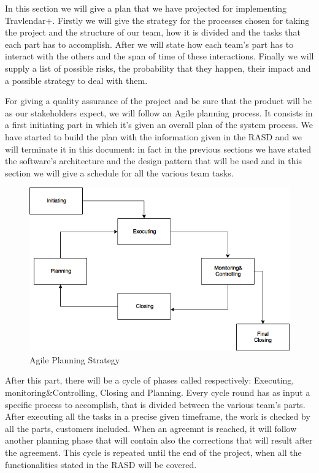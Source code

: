 In this section we will give a plan that we have projected for implementing Travlendar+. 
Firstly we will give the strategy for the processes chosen for taking the project and the structure of our team, how it is divided and the tasks that each part has to accomplish.
After we will state how each team’s part has to interact with the others and the span of time of these interactions. 
Finally we will supply a list of possible risks, the probability that they happen, their impact and a possible strategy to deal with them.

For giving a quality assurance of the project and be sure that the product will be as our stakeholders expect, we will follow an Agile planning process. It consists in a first initiating part in which it’s given an overall plan of the system process. We have started to build the plan with the information given in the RASD and we will terminate it in this document: in fact in the previous sections we have stated the software’s architecture and the design pattern that will be used and in this section we will give a schedule for all the various team tasks.
\begin{figure}[H]
	\centering
	\includegraphics[scale=0.35]{Images/Implementation/Agile_Planning}
	\caption{Agile Planning Strategy}
\end{figure}
After this part, there will be a cycle of phases called respectively: Executing, monitoring\&Controlling, Closing and Planning. 
Every cycle round has as input a specific process to accomplish, that is divided between the various team’s parts. After executing all the tasks in a precise given timeframe, the work is checked by all the parts, customers included. When an agreemnt is reached, it will follow another planning phase that will contain also the corrections that will result after the agreement.
This cycle is repeated until the end of the project, when all the functionalities stated in the RASD will be covered.


